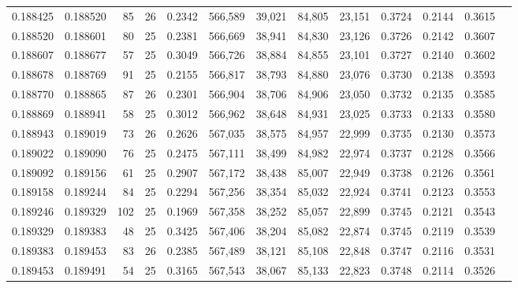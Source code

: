\begin{tabular}{rrrrrrrrrrrrr}
0.188425 & 0.188520 &  85 &  26 &                                     0.2342 & 566,589 &  39,021 &  84,805 &  23,151 & 0.3724 & 0.2144 & 0.3615 \\
0.188520 & 0.188601 &  80 &  25 &                                     0.2381 & 566,669 &  38,941 &  84,830 &  23,126 & 0.3726 & 0.2142 & 0.3607 \\
0.188607 & 0.188677 &  57 &  25 &                                     0.3049 & 566,726 &  38,884 &  84,855 &  23,101 & 0.3727 & 0.2140 & 0.3602 \\
0.188678 & 0.188769 &  91 &  25 &                                     0.2155 & 566,817 &  38,793 &  84,880 &  23,076 & 0.3730 & 0.2138 & 0.3593 \\
0.188770 & 0.188865 &  87 &  26 &                                     0.2301 & 566,904 &  38,706 &  84,906 &  23,050 & 0.3732 & 0.2135 & 0.3585 \\
0.188869 & 0.188941 &  58 &  25 &                                     0.3012 & 566,962 &  38,648 &  84,931 &  23,025 & 0.3733 & 0.2133 & 0.3580 \\
0.188943 & 0.189019 &  73 &  26 &                                     0.2626 & 567,035 &  38,575 &  84,957 &  22,999 & 0.3735 & 0.2130 & 0.3573 \\
0.189022 & 0.189090 &  76 &  25 &                                     0.2475 & 567,111 &  38,499 &  84,982 &  22,974 & 0.3737 & 0.2128 & 0.3566 \\
0.189092 & 0.189156 &  61 &  25 &                                     0.2907 & 567,172 &  38,438 &  85,007 &  22,949 & 0.3738 & 0.2126 & 0.3561 \\
0.189158 & 0.189244 &  84 &  25 &                                     0.2294 & 567,256 &  38,354 &  85,032 &  22,924 & 0.3741 & 0.2123 & 0.3553 \\
0.189246 & 0.189329 & 102 &  25 &                                     0.1969 & 567,358 &  38,252 &  85,057 &  22,899 & 0.3745 & 0.2121 & 0.3543 \\
0.189329 & 0.189383 &  48 &  25 &                                     0.3425 & 567,406 &  38,204 &  85,082 &  22,874 & 0.3745 & 0.2119 & 0.3539 \\
0.189383 & 0.189453 &  83 &  26 &                                     0.2385 & 567,489 &  38,121 &  85,108 &  22,848 & 0.3747 & 0.2116 & 0.3531 \\
0.189453 & 0.189491 &  54 &  25 &                                     0.3165 & 567,543 &  38,067 &  85,133 &  22,823 & 0.3748 & 0.2114 & 0.3526 \\

\end{tabular}
